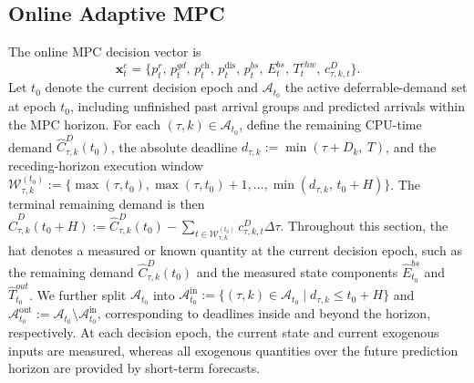\documentclass[a4paper,fleqn]{cas-dc}
\theoremstyle{plain}
\theoremstyle{remark}
\theoremstyle{plain}
\begin{document}
\subsection{Online Adaptive MPC}
The online MPC decision vector is
\[\boldsymbol{x}_t^e = \{p_t^r,\, p_t^{gd},\, p_t^{\text{ch}},\, p_t^{\text{dis}},\, p_t^{bs},\, E_t^{bs},\, T_t^{chw},\, c_{\tau,k,t}^D\}.\]
Let $t_0$ denote the current decision epoch and $\mathcal{A}_{t_0}$ the active deferrable-demand set at epoch $t_0$, including unfinished past arrival groups and predicted arrivals within the MPC horizon.
For each $(\tau,k)\in\mathcal{A}_{t_0}$, define the remaining CPU-time demand $\hat{C}_{\tau,k}^D(t_0)$, the absolute deadline $d_{\tau,k}:=\min(\tau+D_k,\ T)$, and the receding-horizon execution window
$\mathcal{W}_{\tau,k}^{(t_0)} := \{\max(\tau,t_0),\max(\tau,t_0)+1,\ldots,\min(d_{\tau,k},\,t_0+H)\}$.
The terminal remaining demand is then
$\hat{C}_{\tau,k}^D(t_0{+}H):=\hat{C}_{\tau,k}^D(t_0)-\sum_{t\in \mathcal{W}_{\tau,k}^{(t_0)}} c_{\tau,k,t}^D \Delta\tau$.
Throughout this section, the hat denotes a measured or known quantity at the current decision epoch, such as the remaining demand $\hat{C}_{\tau,k}^D(t_0)$ and the measured state components $\hat{E}_{t_0}^{bs}$ and $\hat{T}_{t_0}^{out}$.
We further split $\mathcal{A}_{t_0}$ into $\mathcal{A}_{t_0}^{\mathrm{in}}:=\{(\tau,k)\in\mathcal{A}_{t_0}\mid d_{\tau,k}\le t_0+H\}$ and $\mathcal{A}_{t_0}^{\mathrm{out}}:=\mathcal{A}_{t_0}\setminus\mathcal{A}_{t_0}^{\mathrm{in}}$, corresponding to deadlines inside and beyond the horizon, respectively.
At each decision epoch, the current state and current exogenous inputs are measured, whereas all exogenous quantities over the future prediction horizon are provided by short-term forecasts.
\end{document}
